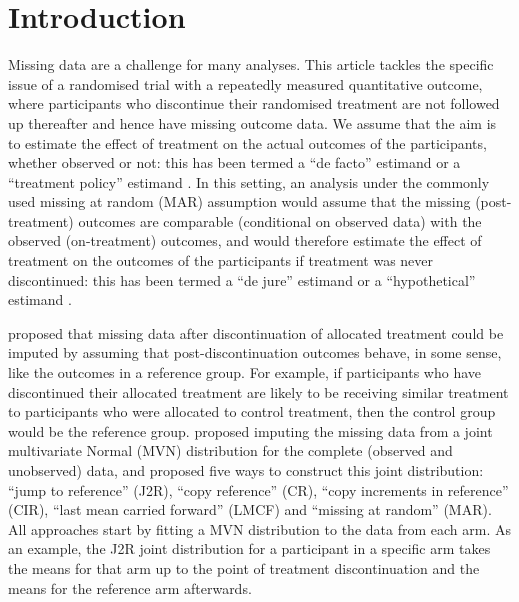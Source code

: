 
\section{Introduction}

Missing data are a challenge for many analyses. This article tackles the specific issue of a randomised trial with a repeatedly measured quantitative outcome, where participants who discontinue their randomised treatment are not followed up thereafter and hence have missing outcome data. 
We assume that the aim is to estimate the effect of treatment on the actual outcomes of the participants, whether observed or not: this has been termed a ``de facto'' estimand \citep{Carpenter++13} or a ``treatment policy'' estimand \citep{ICHE9R1}. 
In this setting, an analysis under the commonly used missing at random (MAR) assumption would assume that the missing (post-treatment) outcomes are comparable (conditional on observed data) with the observed (on-treatment) outcomes, and would therefore estimate the effect of treatment on the outcomes of the participants if treatment was never discontinued: this has been termed a ``de jure'' estimand \citep{Carpenter++13} or a ``hypothetical'' estimand \citep{ICHE9R1}. 

\citet{Carpenter++13} proposed that missing data after discontinuation of allocated treatment could be imputed by assuming that post-discontinuation outcomes behave, in some sense, like the outcomes in a reference group. For example, if participants who have discontinued their allocated treatment are likely to be receiving similar treatment to participants who were allocated to control treatment, then the control group would be the reference group.
\citet{Carpenter++13} proposed imputing the missing data from a joint multivariate Normal (MVN) distribution for the complete (observed and unobserved) data, and proposed five ways to construct this joint distribution: ``jump to reference'' (J2R), ``copy reference'' (CR), ``copy increments in reference'' (CIR), ``last mean carried forward'' (LMCF) and ``missing at random'' (MAR). All approaches start by fitting a MVN distribution to the data from each arm. As an example, the J2R joint distribution for a participant in a specific arm takes the means for that arm up to the point of treatment discontinuation and the means for the reference arm afterwards.

